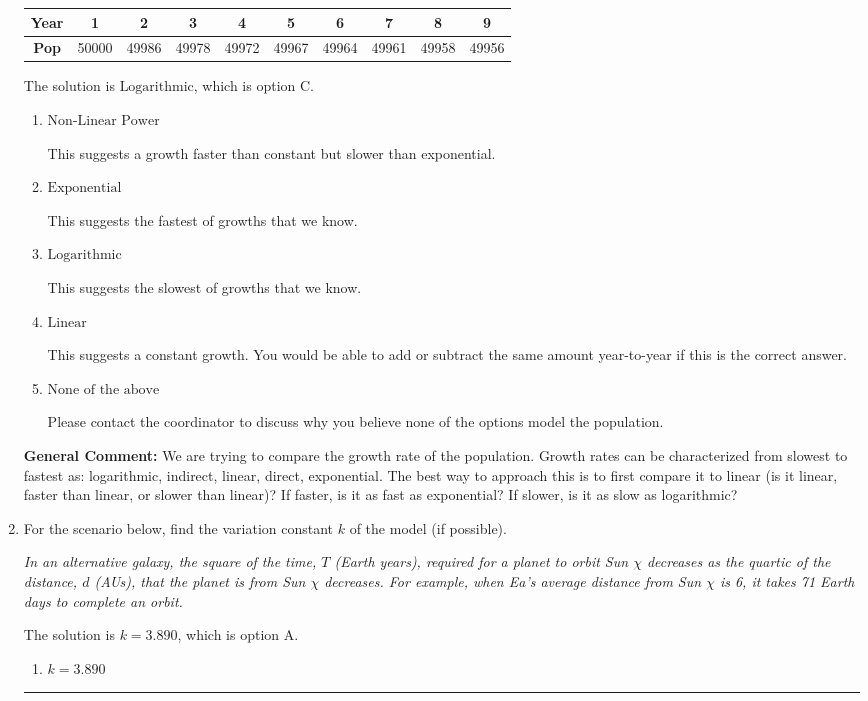 \documentclass{extbook}[14pt]
\newcommand{\litem}[1]{\item #1

\rule{\textwidth}{0.4pt}}
\begin{document}
\begin{enumerate}
{\begin{tabular}{c|c|c|c|c|c|c|c|c|c}
\textbf{Year} &1 &2 &3 &4 &5 &6 &7 &8 &9\tabularnewline \hline
\textbf{Pop} &50000 &49986 &49978 &49972 &49967 &49964 &49961 &49958 &49956\end{tabular}The solution is \( \text{Logarithmic} \), which is option C.\begin{enumerate}[label=\Alph*.]
\item \( \text{Non-Linear Power} \)

This suggests a growth faster than constant but slower than exponential.
\item \( \text{Exponential} \)

This suggests the fastest of growths that we know.
\item \( \text{Logarithmic} \)

This suggests the slowest of growths that we know.
\item \( \text{Linear} \)

This suggests a constant growth. You would be able to add or subtract the same amount year-to-year if this is the correct answer.
\item \( \text{None of the above} \)

Please contact the coordinator to discuss why you believe none of the options model the population.
\end{enumerate}

\textbf{General Comment:} We are trying to compare the growth rate of the population. Growth rates can be characterized from slowest to fastest as: logarithmic, indirect, linear, direct, exponential. The best way to approach this is to first compare it to linear (is it linear, faster than linear, or slower than linear)? If faster, is it as fast as exponential? If slower, is it as slow as logarithmic?
}
\litem{
For the scenario below, find the variation constant $k$ of the model (if possible).

\begin{center}
    \textit{ In an alternative galaxy, the square of the time, $T$ (Earth years), required for a planet to orbit Sun $\chi$ decreases as the quartic of the distance, $d$ (AUs), that the planet is from Sun $\chi$ decreases. For example, when Ea's average distance from Sun $\chi$ is 6, it takes 71 Earth days to complete an orbit. }
\end{center}
The solution is \( k = 3.890 \), which is option A.\begin{enumerate}[label=\Alph*.]
\item \( k = 3.890 \)


\end{enumerate}}
\end{enumerate}
\end{document}
